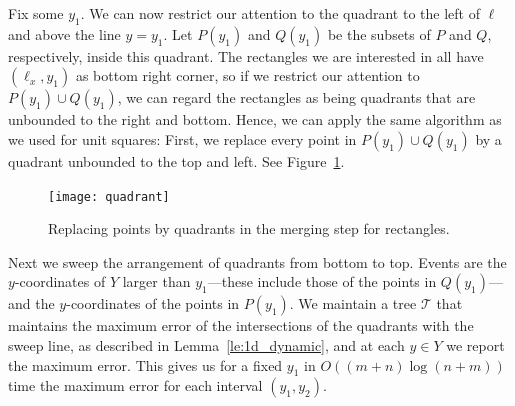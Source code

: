 \documentclass{elsart}
\newcommand{\tree}{{\mathcal T}}
\begin{document}
Fix some $y_1$. We can now restrict our attention to the quadrant to the
left of $\ell$ and above the line $y=y_1$.  Let $P(y_1)$ and $Q(y_1)$
be the subsets of $P$ and $Q$, respectively, inside this quadrant.
The rectangles we are interested in all have $(\ell_x,y_1)$ as bottom
right corner, so if we restrict our attention to $P(y_1)\cup Q(y_1)$,
we can regard the rectangles as being quadrants that are unbounded to
the right and bottom.  Hence, we can apply the same algorithm as we used
for unit squares: First, we replace every point in $P(y_1)\cup Q(y_1)$
by a quadrant unbounded to the top and left.
See Figure~\ref{fi:quadrant}.
\begin{figure}[htb]
\begin{center}
\texttt{[image: quadrant]}
\end{center}
\caption{Replacing points by quadrants in the merging step for rectangles.}
\label{fi:quadrant}
\end{figure}
Next we sweep the arrangement of quadrants from bottom to top.  Events
are the $y$-coordinates of $Y$ larger than $y_1$---these include those
of the points in $Q(y_1)$---and the $y$-coordinates of the points in
$P(y_1)$.  We maintain a tree $\tree$ that maintains the maximum error
of the intersections of the quadrants with the sweep line, as described in Lemma~\ref{le:1d_dynamic}, and at
each $y\in Y$ we report the maximum error.  This gives us for a fixed
$y_1$ in $O((m+n)\log (n+m))$ time the maximum error for each interval
$(y_1,y_2)$.
\end{document}
